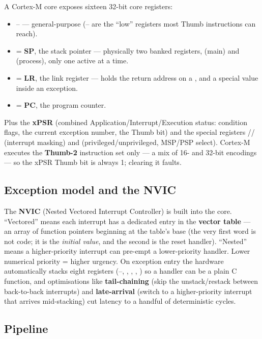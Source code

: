 A Cortex-M core exposes sixteen 32-bit core registers:
\begin{itemize}
\item {}-- --- general-purpose (-- are the
  ``low'' registers most Thumb instructions can reach).
\item {} = \textbf{SP}, the stack pointer --- physically two banked
  registers,  (main) and  (process), only one active at a
  time.
\item {} = \textbf{LR}, the link register --- holds the return address
  on a , and a special  value inside an exception.
\item {} = \textbf{PC}, the program counter.
\end{itemize}
Plus the \textbf{xPSR} (combined Application/Interrupt/Execution status:
condition flags, the current exception number, the Thumb bit) and the special
registers // (interrupt masking)
and  (privileged/unprivileged, MSP/PSP select). Cortex-M
executes the \textbf{Thumb-2} instruction set only --- a mix of 16- and 32-bit
encodings --- so the xPSR Thumb bit is always 1; clearing it faults.

\subsection{Exception model and the NVIC}

The \textbf{NVIC} (Nested Vectored Interrupt Controller) is built into the
core. ``Vectored'' means each interrupt has a dedicated entry in the
\textbf{vector table} --- an array of function pointers beginning at the
table's base (the very first word is not code; it is the \emph{initial
 value}, and the second is the reset handler). ``Nested'' means a
higher-priority interrupt can pre-empt a lower-priority handler. Lower
numerical priority = higher urgency. On exception entry the hardware
automatically stacks eight registers (--, ,
, , ) so a handler can be a plain C function, and
optimisations like \textbf{tail-chaining} (skip the unstack/restack between
back-to-back interrupts) and \textbf{late-arrival} (switch to a
higher-priority interrupt that arrives mid-stacking) cut latency to a handful
of deterministic cycles.

\subsection{Pipeline}

